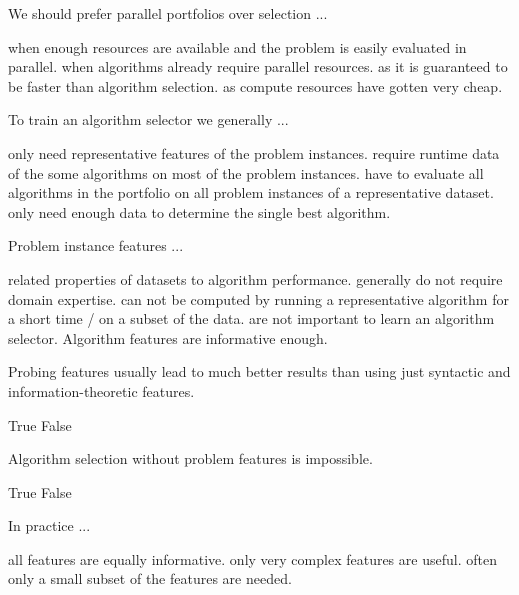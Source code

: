 \documentclass{exam}
\begin{document}
\begin{questions}
\question We should prefer parallel portfolios over selection ...
\begin{choices}
    \choice when enough resources are available and the problem is easily evaluated in parallel. %
    \choice when algorithms already require parallel resources.
    \choice as it is guaranteed to be faster than algorithm selection.
    \choice as compute resources have gotten very cheap.
\end{choices}

\question To train an algorithm selector we generally ...
\begin{choices}
    \choice only need representative features of the problem instances.
    \choice require runtime data of the some algorithms on most of the problem instances.
    \choice have to evaluate all algorithms in the portfolio on all problem instances of a representative dataset. %
    \choice only need enough data to determine the single best algorithm.
\end{choices}

\question Problem instance features ...
\begin{choices}
    \choice related properties of datasets to algorithm performance. %
    \choice generally do not require domain expertise.
    \choice can not be computed by running a representative algorithm for a short time / on a subset of the data.
    \choice are not important to learn an algorithm selector. Algorithm features are informative enough.
\end{choices}

\question Probing features usually lead to much better results than using just syntactic and information-theoretic features.
\begin{choices}
    \choice True  %
    \choice False
\end{choices}

\question Algorithm selection without problem features is impossible.
\begin{choices}
    \choice True
    \choice False %
\end{choices}

\question In practice ...
\begin{choices}
    \choice all features are equally informative.
    \choice only very complex features are useful.
    \choice often only a small subset of the features are needed. %
\end{choices}


\end{questions}
\end{document}

